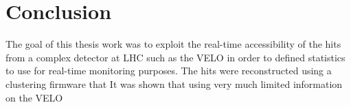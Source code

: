
\chapter{Conclusion}
\label{chp:conclusion}
The goal of this thesis work was to exploit the real-time accessibility of the hits from a complex detector at LHC such as the VELO in order to defined statistics to use for real-time monitoring purposes. The hits were reconstructed using a clustering firmware that  It was shown that using very much limited information on the VELO 